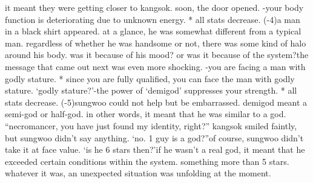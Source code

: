 it meant they were getting closer to kangsok.
soon, the door opened.
-your body function is deteriorating due to unknown energy.
* all stats decrease.
 (-4)a man in a black shirt appeared.
 at a glance, he was somewhat different from a typical man.
regardless of whether he was handsome or not, there was some kind of halo around his body.
was it because of his mood? or was it because of the system?the message that came out next was even more shocking.
-you are facing a man with godly stature.
* since you are fully qualified, you can face the man with godly stature.
‘godly stature?’-the power of ‘demigod’ suppresses your strength.
* all stats decrease.
 (-5)sungwoo could not help but be embarrassed.
 demigod meant a semi-god or half-god.
in other words, it meant that he was similar to a god.
“necromancer, you have just found my identity, right?” kangsok smiled faintly, but sungwoo didn’t say anything.
‘no.
 1 guy is a god?”of course, sungwoo didn’t take it at face value.
‘is he 6 stars then?’if he wasn’t a real god, it meant that he exceeded certain conditions within the system.
 something more than 5 stars.
whatever it was, an unexpected situation was unfolding at the moment.


 